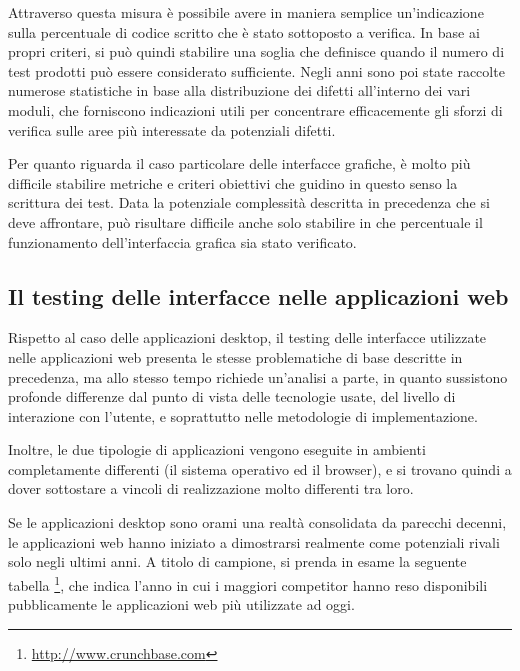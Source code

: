 Attraverso questa misura è possibile avere in maniera semplice un'indicazione sulla percentuale di codice scritto che è stato sottoposto a verifica. In base ai propri criteri, si può quindi stabilire una soglia che definisce quando il numero di test prodotti può essere considerato sufficiente. Negli anni sono poi state raccolte numerose statistiche in base alla distribuzione dei difetti all'interno dei vari moduli, che forniscono indicazioni utili per concentrare efficacemente gli sforzi di verifica sulle aree più interessate da potenziali difetti.

Per quanto riguarda il caso particolare delle interfacce grafiche, è molto più difficile stabilire metriche e criteri obiettivi che guidino in questo senso la scrittura dei test. Data la potenziale complessità descritta in precedenza che si deve affrontare, può risultare difficile anche solo stabilire in che percentuale il funzionamento dell'interfaccia grafica sia stato verificato.

\subsection{Il testing delle interfacce nelle applicazioni web}

Rispetto al caso delle applicazioni desktop, il testing delle interfacce utilizzate nelle applicazioni web presenta le stesse problematiche di base descritte in precedenza, ma allo stesso tempo richiede un'analisi a parte, in quanto sussistono profonde differenze dal punto di vista delle tecnologie usate, del livello di interazione con l'utente, e soprattutto nelle metodologie di implementazione.

Inoltre, le due tipologie di applicazioni vengono eseguite in ambienti completamente differenti (il sistema operativo ed il browser), e si trovano quindi a dover sottostare a vincoli di realizzazione molto differenti tra loro.

Se le applicazioni desktop sono orami una realtà consolidata da parecchi decenni, le applicazioni web hanno iniziato a dimostrarsi realmente come potenziali rivali solo negli ultimi anni. A titolo di campione, si prenda in esame la seguente tabella \footnote{\url{http://www.crunchbase.com}}, che indica l'anno in cui i maggiori competitor hanno reso disponibili pubblicamente le applicazioni web più utilizzate ad oggi.

